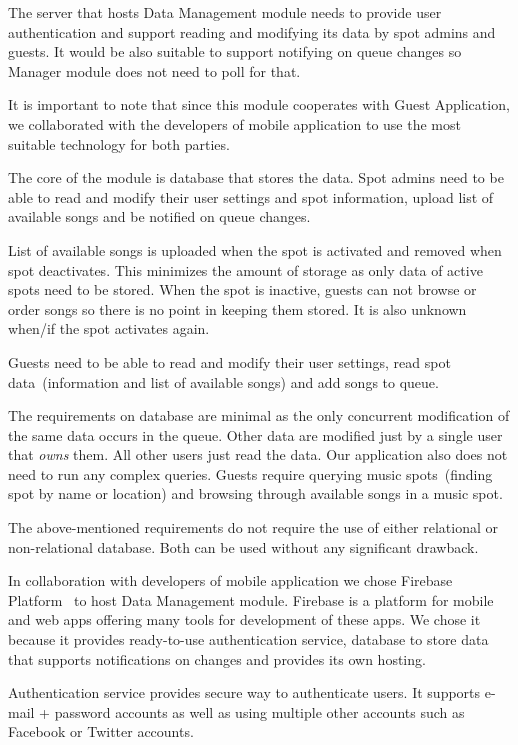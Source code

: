 The server that hosts Data Management module needs to provide user authentication and support reading and modifying its data by spot admins and guests. It would be also suitable to support notifying on queue changes so Manager module does not need to poll for that.
\par
It is important to note that since this module cooperates with Guest Application, we collaborated with the developers of mobile application to use the most suitable technology for both parties.
\par
The core of the module is database that stores the data. Spot admins need to be able to read and modify their user settings and spot information, upload list of available songs and be notified on queue changes.
\par
List of available songs is uploaded when the spot is activated and removed when spot deactivates. This minimizes the amount of storage as only data of active spots need to be stored. When the spot is inactive, guests can not browse or order songs so there is no point in keeping them stored. It is also unknown when/if the spot activates again.
\par
Guests need to be able to read and modify their user settings, read spot data~(information and list of available songs) and add songs to queue.
\par
The requirements on database are minimal as the only concurrent modification of the same data occurs in the queue. Other data are modified just by a single user that \textit{owns} them. All other users just read the data. Our application also does not need to run any complex queries. Guests require querying music spots~(finding spot by name or location) and browsing through available songs in a music spot.
\par
The above-mentioned requirements do not require the use of either relational or non-relational database. Both can be used without any significant drawback.
\par
In collaboration with developers of mobile application we chose Firebase Platform~\citep{firebase} to host Data Management module. Firebase is a platform for mobile and web apps offering many tools for development of these apps. We chose it because it provides ready-to-use authentication service, database to store data that supports notifications on changes and provides its own hosting.
\par
Authentication service provides secure way to authenticate users. It supports e-mail + password accounts as well as using multiple other accounts such as Facebook or Twitter accounts.

